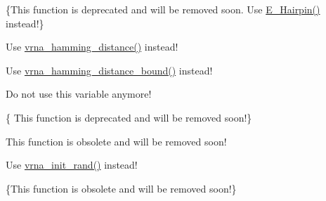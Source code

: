 \begin{DoxyRefList}
\item[\label{deprecated__deprecated000074}%
\hypertarget{deprecated__deprecated000074}{}%
Global \hyperlink{group__mfe__fold__single_gab327ce11972f5ac069d52c8dedfdb700}{Hairpin\+E} (int size, int type, int si1, int sj1, const char $\ast$string)]\{This function is deprecated and will be removed soon. Use \hyperlink{group__loops_gadf943ee9a45b7f4cee9192c06210dace}{E\+\_\+\+Hairpin()} instead!\}  
\item[\label{deprecated__deprecated000127}%
\hypertarget{deprecated__deprecated000127}{}%
Global \hyperlink{string__utils_8h_ad9dc7bfc9aa664dc6698f17ce07fc7e7}{hamming} (const char $\ast$s1, const char $\ast$s2)]Use \hyperlink{group__string__utils_ga301798b43b6f66687985c725efd14f32}{vrna\+\_\+hamming\+\_\+distance()} instead!  
\item[\label{deprecated__deprecated000128}%
\hypertarget{deprecated__deprecated000128}{}%
Global \hyperlink{string__utils_8h_a96d3c36717d624514055ce201cab1542}{hamming\+\_\+bound} (const char $\ast$s1, const char $\ast$s2, int n)]Use \hyperlink{group__string__utils_ga5d1c2271e79d9bcb52d4e68360763fb9}{vrna\+\_\+hamming\+\_\+distance\+\_\+bound()} instead!  
\item[\label{deprecated__deprecated000078}%
\hypertarget{deprecated__deprecated000078}{}%
Global \hyperlink{fold__vars_8h_a92089ae3a51b5d75a14ce9cc29cc8317}{iindx} ]Do not use this variable anymore!  
\item[\label{deprecated__deprecated000114}%
\hypertarget{deprecated__deprecated000114}{}%
Global \hyperlink{part__func__co_8h_aa12dda9dd6179cdd22bcce87c0682c07}{init\+\_\+co\+\_\+pf\+\_\+fold} (int length)]\{ This function is deprecated and will be removed soon!\}  
\item[\label{deprecated__deprecated000103}%
\hypertarget{deprecated__deprecated000103}{}%
Global \hyperlink{part__func_8h_a15176e23eceeff8c7d14eabcfec8a2af}{init\+\_\+pf\+\_\+fold} (int length)]This function is obsolete and will be removed soon!  
\item[\label{deprecated__deprecated000152}%
\hypertarget{deprecated__deprecated000152}{}%
Global \hyperlink{utils_8h_a8aaa6d9be6f803f496d9b97375c371f3}{init\+\_\+rand} (void)]Use \hyperlink{group__utils_ga0ad1f40ea316e5c5918695c35613027a}{vrna\+\_\+init\+\_\+rand()} instead!  
\item[\label{deprecated__deprecated000038}%
\hypertarget{deprecated__deprecated000038}{}%
Global \hyperlink{group__mfe__cofold_gafee0c32208aa2ac97338b6e3fbad7fa5}{initialize\+\_\+cofold} (int length)]\{This function is obsolete and will be removed soon!\}  

\end{DoxyRefList}
